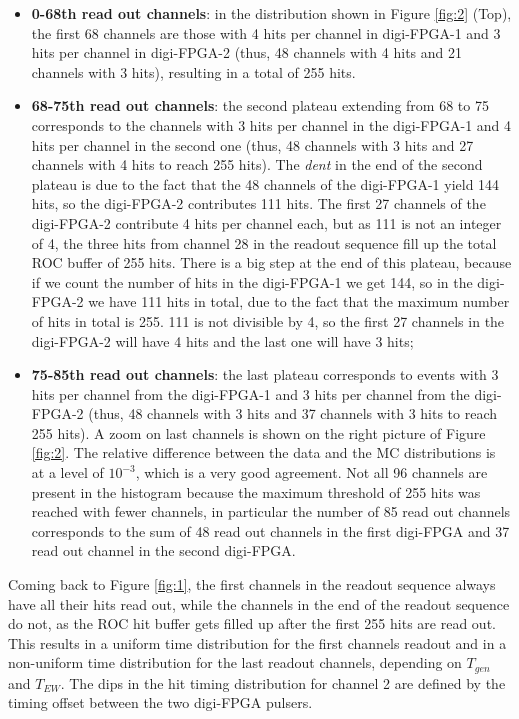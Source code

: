 \begin{itemize}
  \item \textbf{0-68th read out channels}: in the distribution shown 
  in Figure \ref{fig:2} (Top), the first 68 channels are 
  those with 4 hits per channel in digi-FPGA-1 and 3 hits per 
  channel in digi-FPGA-2 (thus, 48 channels with 4 hits and 21 
  channels with 3 hits), resulting in a total of 255 hits.
  \item \textbf{68-75th read out channels}: 
  the second plateau extending from 68 to 75 corresponds to the channels
  with 3 hits per channel in the digi-FPGA-1 and 4 hits per channel in the second one 
  (thus, 48 channels with 3 hits and 27 channels with 4 hits to reach 255 hits).
  The \textit{dent} in the end of the second plateau is due to the 
  fact that the 48 channels of the digi-FPGA-1 yield 144 hits, so 
  the digi-FPGA-2 contributes 111 hits. The first 27 channels of the digi-FPGA-2 contribute
  4 hits per channel each, but as 111 is not an integer of 4, 
  the three hits from channel 28 in the readout sequence
  fill up the total ROC buffer of 255 hits. There is a big step at the 
  end of this plateau, because if we count the number of hits
  in the digi-FPGA-1 we get 144, so in the digi-FPGA-2 we have 111 hits in total,
  due to the fact that the maximum number of hits in total is 255.
  111 is not divisible by 4, so the first 27 channels in the digi-FPGA-2 will have 4 hits
  and the last one will have 3 hits;
  \item \textbf{75-85th read out channels}: the last plateau corresponds to events 
  with 3 hits per channel from the digi-FPGA-1 and 3 hits per channel from the digi-FPGA-2 
  (thus, 48 channels with 3 hits and 37 channels with 3 hits to reach 255 hits).
  A zoom on last channels is shown on the right picture of Figure \ref{fig:2}.
  The relative difference between the data and the MC distributions 
  is at a level of $10^{-3}$, which is a very good agreement.
  Not all 96 channels are present in the histogram because the maximum 
  threshold of 255 hits was reached with fewer channels, in particular the number of 
  85 read out channels corresponds to the sum of 48 read out channels in the first 
  digi-FPGA and 37 read out channel in the second digi-FPGA.
\end{itemize}




Coming back to Figure \ref{fig:1}, the first channels in the readout sequence
always have all their hits read out,
while the channels in the end of the readout sequence do not,
as the ROC hit buffer gets filled up after
the first 255 hits are read out.
This results in a uniform time distribution for the first channels readout and in a non-uniform
time distribution for the last readout channels, depending on $T_{gen}$ and $T_{EW}$.
The dips in the hit timing distribution for channel 2 are defined by the timing offset
between the two digi-FPGA pulsers. 


